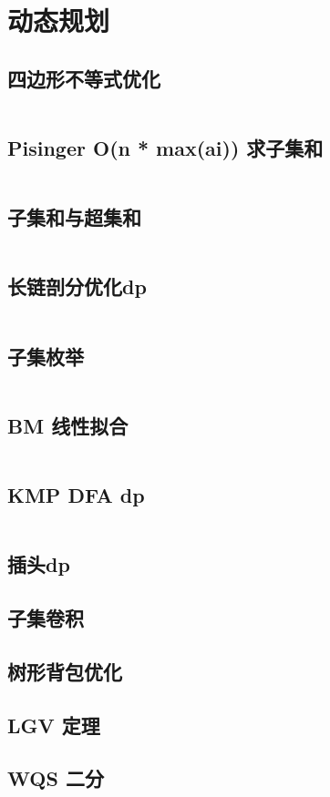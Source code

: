 \section{动态规划}
\subsection{四边形不等式优化}
  \inputminted{cpp}{sections/DynamicProgramming/assets/2D1D.cpp}
\subsection{Pisinger O(n * max(ai)) 求子集和}
  \inputminted{cpp}{sections/DynamicProgramming/assets/Pisinger Subset Sum.cpp}
\subsection{子集和与超集和}
  \inputminted{cpp}{sections/DynamicProgramming/assets/Subset Sum.cpp}
\subsection{长链剖分优化dp}
  \inputminted{cpp}{sections/DynamicProgramming/assets/长链剖分优化dp.cpp}
\subsection{子集枚举}
  \inputminted{cpp}{sections/DynamicProgramming/assets/子集枚举.cpp}
\subsection{BM 线性拟合}
  \inputminted{cpp}{sections/DynamicProgramming/assets/BM 线性拟合.cpp}
\subsection{KMP DFA dp}
  \inputminted{cpp}{sections/DynamicProgramming/assets/KMP-DFA.cpp}
\subsection{插头dp}
  
\subsection{子集卷积}
  
\subsection{树形背包优化}
  
\subsection{LGV 定理}
  
\subsection{WQS 二分}
  
  
